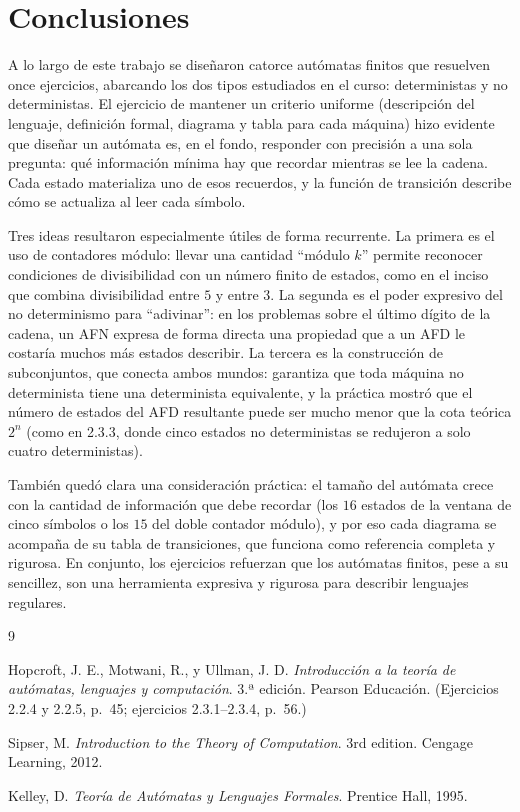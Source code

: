 \documentclass[12pt]{article}
\begin{document}
\clearpage
\section{Conclusiones}

A lo largo de este trabajo se diseñaron catorce autómatas finitos que resuelven once ejercicios, abarcando los dos tipos estudiados en el curso: deterministas y no deterministas. El ejercicio de mantener un criterio uniforme (descripción del lenguaje, definición formal, diagrama y tabla para cada máquina) hizo evidente que diseñar un autómata es, en el fondo, responder con precisión a una sola pregunta: qué información mínima hay que recordar mientras se lee la cadena. Cada estado materializa uno de esos recuerdos, y la función de transición describe cómo se actualiza al leer cada símbolo.

Tres ideas resultaron especialmente útiles de forma recurrente. La primera es el uso de contadores módulo: llevar una cantidad ``módulo $k$'' permite reconocer condiciones de divisibilidad con un número finito de estados, como en el inciso que combina divisibilidad entre $5$ y entre $3$. La segunda es el poder expresivo del no determinismo para ``adivinar'': en los problemas sobre el último dígito de la cadena, un AFN expresa de forma directa una propiedad que a un AFD le costaría muchos más estados describir. La tercera es la construcción de subconjuntos, que conecta ambos mundos: garantiza que toda máquina no determinista tiene una determinista equivalente, y la práctica mostró que el número de estados del AFD resultante puede ser mucho menor que la cota teórica $2^n$ (como en 2.3.3, donde cinco estados no deterministas se redujeron a solo cuatro deterministas).

También quedó clara una consideración práctica: el tamaño del autómata crece con la cantidad de información que debe recordar (los $16$ estados de la ventana de cinco símbolos o los $15$ del doble contador módulo), y por eso cada diagrama se acompaña de su tabla de transiciones, que funciona como referencia completa y rigurosa. En conjunto, los ejercicios refuerzan que los autómatas finitos, pese a su sencillez, son una herramienta expresiva y rigurosa para describir lenguajes regulares.

\clearpage
\begin{thebibliography}{9}

Hopcroft, J. E., Motwani, R., y Ullman, J. D.
\textit{Introducción a la teoría de autómatas, lenguajes y computación}.
3.ª edición. Pearson Educación. (Ejercicios 2.2.4 y 2.2.5, p.\ 45; ejercicios 2.3.1--2.3.4, p.\ 56.)

Sipser, M.
\textit{Introduction to the Theory of Computation}.
3rd edition. Cengage Learning, 2012.

Kelley, D.
\textit{Teoría de Autómatas y Lenguajes Formales}.
Prentice Hall, 1995.

\end{thebibliography}
\end{document}
